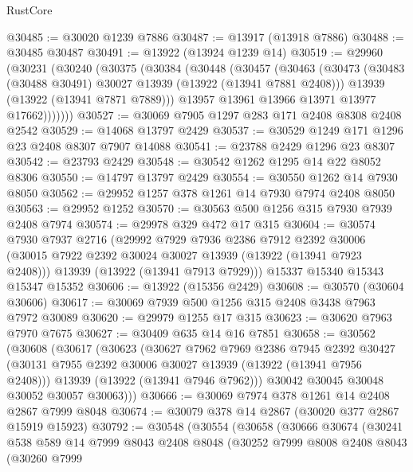 \begin{lexlean}{RustCore}
\begin{coremodule}
@30485 := @30020 @1239 @7886
@30487 := @13917 (@13918 @7886)
@30488 := @30485 @30487
@30491 := @13922 (@13924 @1239 @14)
@30519 := @29960
    (@30231
      (@30240
        (@30375
          (@30384
            (@30448
              (@30457
                (@30463
                  (@30473
                    (@30483 (@30488 @30491) @30027 @13939 (@13922 (@13941 @7881 @2408)))
                    @13939
                    (@13922 (@13941 @7871 @7889)))
                  @13957
                  @13961
                  @13966
                  @13971
                  @13977
                  @17662)))))))
@30527 := @30069 @7905 @1297 @283 @171 @2408 @8308 @2408 @2542
@30529 := @14068 @13797 @2429
@30537 := @30529 @1249 @171 @1296 @23 @2408 @8307 @7907 @14088
@30541 := @23788 @2429 @1296 @23 @8307
@30542 := @23793 @2429
@30548 := @30542 @1262 @1295 @14 @22 @8052 @8306
@30550 := @14797 @13797 @2429
@30554 := @30550 @1262 @14 @7930 @8050
@30562 := @29952 @1257 @378 @1261 @14 @7930 @7974 @2408 @8050
@30563 := @29952 @1252
@30570 := @30563 @500 @1256 @315 @7930 @7939 @2408 @7974
@30574 := @29978 @329 @472 @17 @315
@30604 := @30574
    @7930
    @7937
    @2716
    (@29992
      @7929
      @7936
      @2386
      @7912
      @2392
      @30006
      (@30015 @7922 @2392 @30024 @30027 @13939 (@13922 (@13941 @7923 @2408)))
      @13939
      (@13922 (@13941 @7913 @7929)))
    @15337
    @15340
    @15343
    @15347
    @15352
@30606 := @13922 (@15356 @2429)
@30608 := @30570 (@30604 @30606)
@30617 := @30069 @7939 @500 @1256 @315 @2408 @3438 @7963 @7972 @30089
@30620 := @29979 @1255 @17 @315
@30623 := @30620 @7963 @7970 @7675
@30627 := @30409 @635 @14 @16 @7851
@30658 := @30562
    (@30608
      (@30617
        (@30623
          (@30627
            @7962
            @7969
            @2386
            @7945
            @2392
            @30427
            (@30131 @7955 @2392 @30006 @30027 @13939 (@13922 (@13941 @7956 @2408)))
            @13939
            (@13922 (@13941 @7946 @7962)))
          @30042
          @30045
          @30048
          @30052
          @30057
          @30063)))
@30666 := @30069 @7974 @378 @1261 @14 @2408 @2867 @7999 @8048
@30674 := @30079 @378 @14 @2867 (@30020 @377 @2867 @15919 @15923)
@30792 := @30548
    (@30554
      (@30658
        (@30666
          @30674
          (@30241
            @538
            @589
            @14
            @7999
            @8043
            @2408
            @8048
            (@30252
              @7999
              @8008
              @2408
              @8043
              (@30260
                @7999

\end{coremodule}
\end{lexlean}
